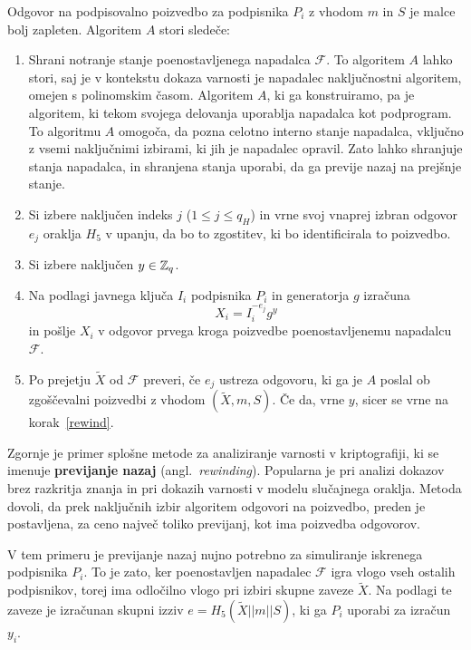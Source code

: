 \begin{dokaz}
Odgovor na podpisovalno poizvedbo za podpisnika $P_i$ z vhodom $m$ in $S$ je malce bolj zapleten.
Algoritem $A$ stori sledeče:
\begin{enumerate}
    \item Shrani notranje stanje poenostavljenega napadalca $\mathcal{F}$. To algoritem $A$ lahko
        stori, saj je v  kontekstu dokaza varnosti je napadalec naključnostni algoritem, omejen s
        polinomskim časom. Algoritem $A$, ki ga konstruiramo, pa je algoritem, ki tekom svojega
        delovanja uporablja napadalca kot podprogram. To algoritmu $A$ omogoča, da pozna celotno
        interno stanje napadalca, vključno z vsemi naključnimi izbirami, ki jih je napadalec opravil.
        Zato lahko shranjuje stanja napadalca, in shranjena stanja uporabi, da ga previje nazaj na
        prejšnje stanje.
    \item \label{rewind} Si izbere naključen indeks $j$ ($1 \le j \le q_H$) in vrne svoj vnaprej izbran
        odgovor $e_j$ oraklja $H_5$ v upanju, da bo to zgostitev, ki bo identificirala to poizvedbo.
    \item Si izbere naključen $y \in \mathbb Z_q$.
    \item Na podlagi javnega ključa $I_i$ podpisnika $P_i$ in generatorja $g$ izračuna 
        $$
        X_i = I_i^{-e_j}g^y
        $$
        in pošlje $X_i$ v odgovor prvega kroga poizvedbe poenostavljenemu napadalcu $\mathcal{F}$.
    \item Po prejetju $\tilde{X}$ od $\mathcal{F}$ preveri, če $e_j$ ustreza odgovoru, ki ga je $A$
        poslal ob zgoščevalni poizvedbi z vhodom $(\tilde{X}, m, S)$. Če da, vrne $y$, sicer se vrne
        na korak~\ref{rewind}.
\end{enumerate}
Zgornje je primer splošne metode za analiziranje varnosti v kriptografiji, ki se imenuje 
\textbf{previjanje nazaj} (angl.\ \textit{rewinding}). Popularna je pri analizi dokazov brez razkritja
znanja in pri dokazih varnosti v modelu slučajnega oraklja. Metoda dovoli, da prek naključnih izbir
algoritem odgovori na poizvedbo, preden je postavljena, za ceno največ toliko previjanj, kot ima
poizvedba odgovorov.

V tem primeru je previjanje nazaj nujno potrebno za simuliranje iskrenega podpisnika $P_i$. To je zato,
ker poenostavljen napadalec $\mathcal{F}$ igra vlogo vseh ostalih podpisnikov, torej ima odločilno
vlogo pri izbiri skupne zaveze $\tilde{X}$. Na podlagi te zaveze je izračunan skupni izziv 
$e = H_5(\tilde{X} || m || S)$, ki ga $P_i$ uporabi za izračun $y_i$. 


\end{dokaz}
